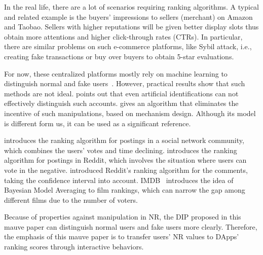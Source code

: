 In the real life, there are a lot of scenarios requiring ranking algorithms. A
typical and related example is the buyers' impressions to sellers (merchant) on
Amazon and Taobao. Sellers with higher reputations will be given better display
slots thus obtain more attentions and higher click-through rates (CTRs). In
particular, there are similar problems on such e-commerce platforms, like Sybil attack, i.e., creating fake transactions or buy over buyers to obtain 5-star evaluations.

For now, these centralized platforms mostly rely on machine learning to
distinguish normal and fake
users~\cite{mukherjee2013spotting,jindal2008opinion,yoo2009comparison}.
However, practical results show that such methods are not ideal.
\cite{ott2011finding} points out that even artificial identifications can not
effectively distinguish such accounts. \cite{cai2016mechanism} gives an
algorithm that eliminates the incentive of such manipulations, based on
mechanism design. Although its model is different form us, it can be used as a significant reference.

\cite{salihefendic2010hacker} introduces the ranking algorithm for postings in
a social network community, which combines the users' votes and time declining.
\cite{salihefendic2010reddit} introduces the ranking algorithm for postings in Reddit, which involves the situation where users can vote in the negative.
\cite{miller2009how} introduced Reddit's ranking algorithm for the comments, taking the confidence interval into account.
IMDB~\cite{IMDB} introduces the idea of Bayesian Model Averaging to film
rankings, which can narrow the gap among different films due to the number of voters.

Because of properties against manipulation in NR, the DIP proposed in this mauve paper can distinguish normal users and fake users more clearly. Therefore, the emphasis of this mauve paper is to transfer users' NR values to DApps' ranking scores through interactive behaviors.


